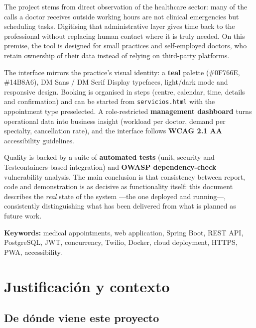 \documentclass[12pt,a4paper]{report}
\begin{document}
The project stems from direct observation of the healthcare sector: many of the calls a doctor receives outside working hours are not clinical emergencies but scheduling tasks. Digitising that administrative layer gives time back to the professional without replacing human contact where it is truly needed. On this premise, the tool is designed for small practices and self-employed doctors, who retain ownership of their data instead of relying on third-party platforms.

The interface mirrors the practice's visual identity: a \textbf{teal} palette (\#0F766E, \#14B8A6), DM Sans / DM Serif Display typefaces, light/dark mode and responsive design. Booking is organised in steps (centre, calendar, time, details and confirmation) and can be started from \texttt{servicios.html} with the appointment type preselected. A role-restricted \textbf{management dashboard} turns operational data into business insight (workload per doctor, demand per specialty, cancellation rate), and the interface follows \textbf{WCAG 2.1 AA} accessibility guidelines.

Quality is backed by a suite of \textbf{automated tests} (unit, security and Testcontainers-based integration) and \textbf{OWASP dependency-check} vulnerability analysis. The main conclusion is that consistency between report, code and demonstration is as decisive as functionality itself: this document describes the \emph{real} state of the system —the one deployed and running—, consistently distinguishing what has been delivered from what is planned as future work.

\vspace{0.5em}
\noindent\textbf{Keywords:} medical appointments, web application, Spring Boot, REST API, PostgreSQL, JWT, concurrency, Twilio, Docker, cloud deployment, HTTPS, PWA, accessibility.

\clearpage
\tableofcontents
\newpage

\chapter{Justificación y contexto}

\section{De dónde viene este proyecto}
\end{document}
